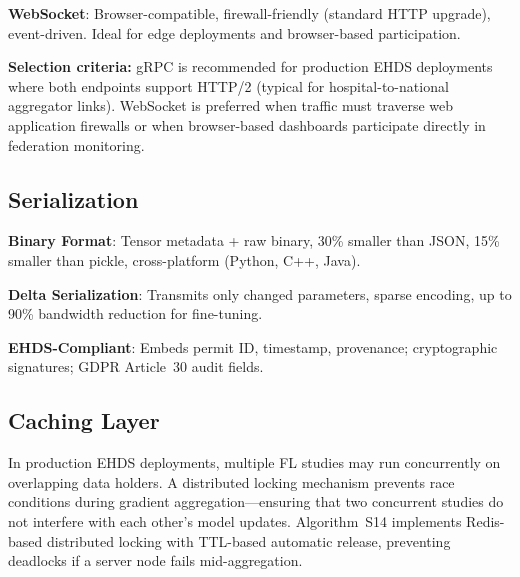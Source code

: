\documentclass[conference,a4paper]{IEEEtran}
\begin{document}
\textbf{WebSocket}: Browser-compatible, firewall-friendly (standard HTTP upgrade), event-driven. Ideal for edge deployments and browser-based participation.

\textbf{Selection criteria:} gRPC is recommended for production EHDS deployments where both endpoints support HTTP/2 (typical for hospital-to-national aggregator links). WebSocket is preferred when traffic must traverse web application firewalls or when browser-based dashboards participate directly in federation monitoring.

\subsection{Serialization}

\textbf{Binary Format}: Tensor metadata + raw binary, 30\% smaller than JSON, 15\% smaller than pickle, cross-platform (Python, C++, Java).

\textbf{Delta Serialization}: Transmits only changed parameters, sparse encoding, up to 90\% bandwidth reduction for fine-tuning.

\textbf{EHDS-Compliant}: Embeds permit ID, timestamp, provenance; cryptographic signatures; GDPR Article~30 audit fields.

\subsection{Caching Layer}

In production EHDS deployments, multiple FL studies may run concurrently on overlapping data holders. A distributed locking mechanism prevents race conditions during gradient aggregation---ensuring that two concurrent studies do not interfere with each other's model updates. Algorithm~S14 implements Redis-based distributed locking with TTL-based automatic release, preventing deadlocks if a server node fails mid-aggregation.

\begin{figure}[htbp]
\centering
{}
\end{figure}
\end{document}
